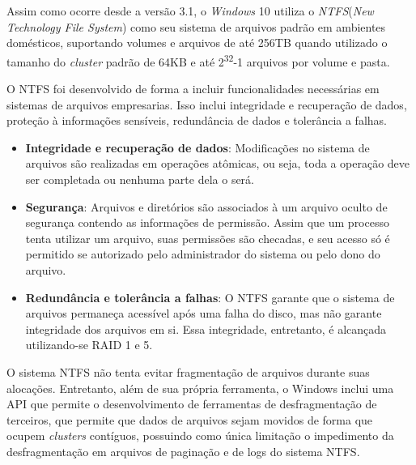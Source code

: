 Assim como ocorre desde a versão 3.1, o \emph{Windows} 10 utiliza o \emph{NTFS}(\emph{New Technology File System}) como seu sistema de arquivos padrão em ambientes domésticos, suportando volumes e arquivos de até 256TB quando utilizado o tamanho do \emph{cluster} padrão de 64KB e até 2\textsuperscript{32}-1 arquivos por volume e pasta.

O NTFS foi desenvolvido de forma a incluir funcionalidades necessárias em sistemas de arquivos empresarias. Isso inclui integridade e recuperação de dados, proteção à informações sensíveis, redundância de dados e tolerância a falhas.
\begin{itemize}
	\item \textbf{Integridade e recuperação de dados}: Modificações no sistema de arquivos são realizadas em operações atômicas, ou seja, toda a operação deve ser completada ou nenhuma parte dela o será.
	\item \textbf{Segurança}: Arquivos e diretórios são associados à um arquivo oculto de segurança contendo as informações de permissão. Assim que um processo tenta utilizar um arquivo, suas permissões são checadas, e seu acesso só é permitido se autorizado pelo administrador do sistema ou pelo dono do arquivo.
	\item \textbf{Redundância e tolerância a falhas}: O NTFS garante que o sistema de arquivos permaneça acessível após uma falha do disco, mas não garante integridade dos arquivos em si. Essa integridade, entretanto, é alcançada utilizando-se RAID 1 e 5.
\end{itemize}

O sistema NTFS não tenta evitar fragmentação de arquivos durante suas alocações. Entretanto, além de sua própria ferramenta, o Windows inclui uma API que permite o desenvolvimento de ferramentas de desfragmentação de terceiros, que permite que dados de arquivos sejam movidos de forma que ocupem \emph{clusters} contíguos, possuindo como única limitação o impedimento da desfragmentação em arquivos de paginação e de logs do sistema NTFS.

